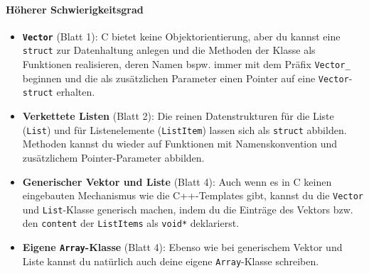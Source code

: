 \paragraph{Höherer Schwierigkeitsgrad}
\begin{itemize}
\item
\textbf{\lstinline|Vector|} (Blatt 1): C bietet keine Objektorientierung, aber du kannst eine \lstinline|struct| zur Datenhaltung anlegen und die Methoden der Klasse als Funktionen realisieren, deren Namen bspw. immer mit dem Präfix \lstinline|Vector_| beginnen und die als zusätzlichen Parameter einen Pointer auf eine \lstinline|Vector|-\lstinline|struct| erhalten.

\item 
\textbf{Verkettete Listen} (Blatt 2):
Die reinen Datenstrukturen für die Liste (\lstinline|List|) und für Listenelemente (\lstinline|ListItem|) lassen sich als \lstinline|struct| abbilden.
Methoden kannst du wieder auf Funktionen mit Namenskonvention und zusätzlichem Pointer-Parameter abbilden.

\item
\textbf{Generischer Vektor und Liste} (Blatt 4):
Auch wenn es in C keinen eingebauten Mechanismus wie die C++-Templates gibt, kannst du die \lstinline|Vector| und \lstinline|List|-Klasse generisch machen, indem du die Einträge des Vektors bzw. den \lstinline|content| der \lstinline|ListItems| als \lstinline|void*| deklarierst.

\item
\textbf{Eigene \lstinline|Array|-Klasse} (Blatt 4):
Ebenso wie bei generischem Vektor und Liste kannst du natürlich auch deine eigene \lstinline|Array|-Klasse schreiben.
\end{itemize}
